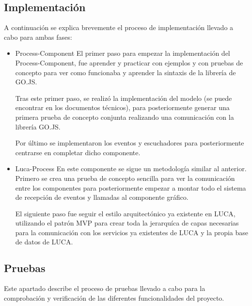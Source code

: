 \subsection{Implementación}
	A continuación se explica brevemente el proceso de implementación llevado a cabo para ambas fases:
	\begin{itemize}
		\item Process-Component
			\subitem El primer paso para empezar la implementación del Process-Component, fue aprender y practicar con ejemplos y con pruebas de concepto para ver como funcionaba y aprender la sintaxis de la librería de GO.JS.
			
			\vspace{5mm}
			
			Tras este primer paso, se realizó la implementación del modelo (se puede encontrar en los documentos técnicos), para posteriormente generar una primera prueba de concepto conjunta realizando una comunicación con la librería GO.JS.
			
			
			\vspace{5mm}
			
			Por último se implementaron los eventos y escuchadores para posteriormente centrarse en completar dicho componente.
			
			
			
		\item  Luca-Process
			\subitem En este componente se sigue un metodología similar al anterior. Primero se crea una prueba de concepto sencilla para ver la comunicación entre los componentes para posteriormente empezar a montar todo el sistema de recepción de eventos y llamadas al componente gráfico.
			
			\vspace{5mm}
			
			El siguiente paso fue seguir el estilo arquitectónico ya existente en LUCA, utilizando el patrón MVP\cite{mvp} para crear toda la jerarquíca de capas necesarias para la comunicación con los servicios ya existentes de LUCA y la propia base de datos de LUCA.
		
	\end{itemize}

	
\subsection{Pruebas}

	Este apartado describe el proceso de pruebas llevado a cabo para la comprobación y verificación de las diferentes funcionalidades del proyecto.
	

